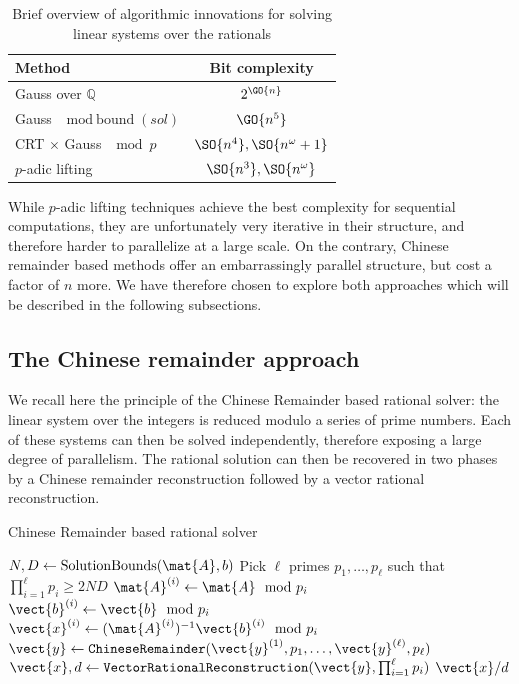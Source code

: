 \begin{table}[htb]
\begin{tabular}{lc}
  \toprule
  Method  & Bit complexity \\
  \midrule
  Gauss over $\mathbb{Q}$ & $2^{\GO{n}}$ \\
  Gauss $\mod \text{bound}(sol)$ & $\GO{n^5}$\\
  CRT $\times$ Gauss $\mod p$ & $\SO{n^4}, \SO{n^\omega+1}$\\
  $p$-adic lifting & $\SO{n^3}, \SO{n^\omega}$\\
  \bottomrule
\end{tabular}
\caption{Brief overview of algorithmic innovations for solving linear systems over the rationals}\label{tab:complexities}
\end{table}

While $p$-adic lifting techniques achieve the best complexity for sequential computations, they are unfortunately very
iterative in their structure, and therefore harder to parallelize at a large scale. On the contrary, Chinese remainder
based methods offer an embarrassingly parallel structure, but cost a factor of $n$ more. We have therefore chosen to
explore both approaches which will be described in the following subsections.
\subsection{The Chinese remainder approach}

We recall here the principle of the Chinese Remainder based rational solver:
the linear system over the integers is reduced modulo a series of prime numbers. Each of these systems can then be solved
independently, therefore exposing a large degree of parallelism. The rational solution can then be recovered in two
phases by a Chinese remainder reconstruction followed by a vector rational reconstruction.

\begin{algorithm}[htb]
  \caption{Chinese Remainder based rational solver}\label{alg:CRTRS}
  \begin{algorithmic}[1]
    \State $N,D \leftarrow \text{SolutionBounds}(\mat{A},b)$
    \State Pick $\ell$ primes $p_1,\dots, p_\ell$ such that $\prod_{i=1}^\ell p_i \geq 2ND$
    \State\label{lin:CRT:RNSA} $\mat{A}^{(i)} \leftarrow \mat{A}\mod p_i$
    \State\label{lin:CRT:RNSb} $\vect{b}^{(i)} \leftarrow \vect{b}\mod p_i$
    \State\label{lin:CRT:solve} $\vect{x}^{(i)} \leftarrow (\mat{A}^{(i)})^{-1} \vect{b}^{(i)} \mod p_i$
    \EndFor
  \State\label{lin:CRT:CRT} $\vect{y} \leftarrow \texttt{ChineseRemainder}(\vect{y}^{(1)},p_1,\dots, \vect{y}^{(\ell)},p_\ell)$
  \State\label{lin:CRT:RR} $\vect{x},d\leftarrow \texttt{VectorRationalReconstruction}(\vect{y},\prod_{i=1}^\ell p_i)$
  \State \Return $\vect{x}/d$
\end{algorithmic}
\end{algorithm}

